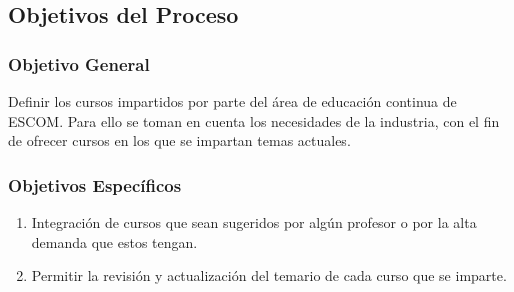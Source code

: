 
\subsection{Objetivos del Proceso} 	%

\subsubsection{Objetivo General}	%
	Definir los cursos impartidos por parte del \'area de educaci\'on continua de ESCOM. Para ello se toman en cuenta los necesidades de la industria, con el fin de ofrecer cursos en los que se impartan temas actuales.
\subsubsection{Objetivos Específicos}	%

\begin{enumerate}[I] 			%
	\item Integraci\'on de cursos que sean sugeridos por alg\'un profesor o por la alta demanda que estos tengan.
	\item Permitir la revisi\'on y actualizaci\'on del temario de cada curso que se imparte. 
\end{enumerate}

